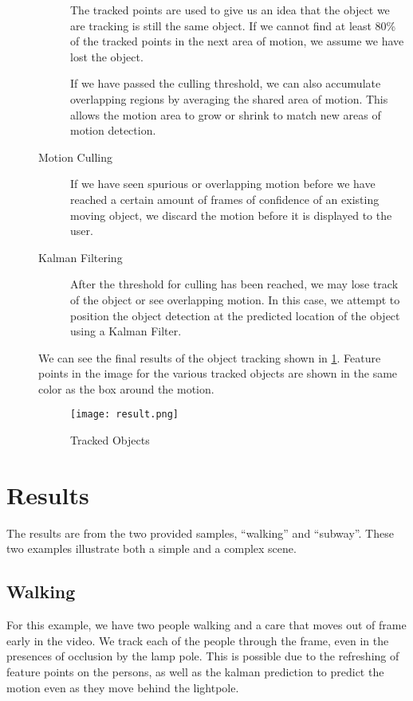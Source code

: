 \documentclass[11pt]{article}
\begin{document}
\begin{description}
\begin{description}
The tracked points are used to give us an idea that the object we are tracking is still the same object. If we cannot find at least 80\% of the tracked points in the next area of motion, we assume we have lost the object.

If we have passed the culling threshold, we can also accumulate overlapping regions by averaging the shared area of motion. This allows the motion area to grow or shrink to match new areas of motion detection.
\item[Motion Culling]
If we have seen spurious or overlapping motion before we have reached a certain amount of frames of confidence of an existing moving object, we discard the motion before it is displayed to the user.
\item[Kalman Filtering]
After the threshold for culling has been reached, we may lose track of the object or see overlapping motion. In this case, we attempt to position the object detection at the predicted location of the object using a Kalman Filter.
\end{description}

We can see the final results of the object tracking shown in \cref{fig:flow_final}. Feature points in the image for the various tracked objects are shown in the same color as the box around the motion.

\begin{figure}[h]
\centering
\captionsetup{width=0.8\textwidth}
\texttt{[image: result.png]}
\caption{Tracked Objects}
\label{fig:flow_final}
\end{figure}

\end{description}

\section{Results}
The results are from the two provided samples, ``walking'' and ``subway''. These two examples illustrate both a simple and a complex scene.

\subsection{Walking}
For this example, we have two people walking and a care that moves out of frame early in the video. We track each of the people through the frame, even in the presences of occlusion by the lamp pole. This is possible due to the refreshing of feature points on the persons, as well as the kalman prediction to predict the motion even as they move behind the lightpole.
\end{document}
